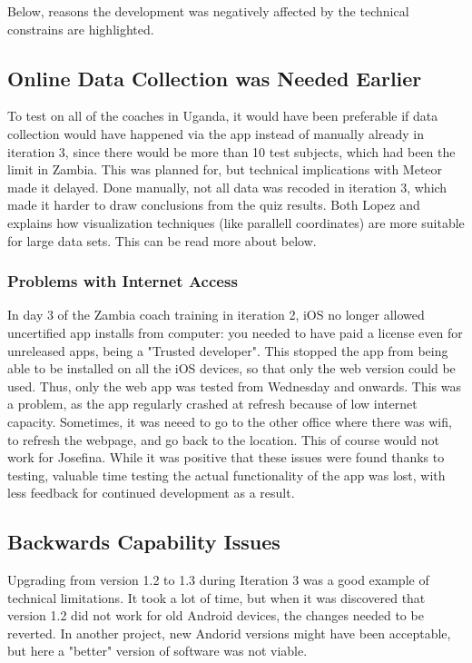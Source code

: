 Below, reasons the development was negatively affected by the technical constrains are highlighted.

\subsection{Online Data Collection was Needed Earlier}
To test on all of the coaches in Uganda, it would have been preferable if data collection would have happened via the app instead of manually already in iteration 3, since there would be more than 10 test subjects, which had been the limit in Zambia. This was planned for, but technical implications with Meteor made it delayed. Done manually, not all data was recoded in iteration 3, which made it harder to draw conclusions from the quiz results. Both Lopez \cite{une-terre} and \cite{ropinski} explains how visualization techniques (like parallell coordinates) are more suitable for large data sets. This can be read more about below.

\subsubsection{Problems with Internet Access}
In day 3 of the Zambia coach training in iteration 2, iOS no longer allowed uncertified app installs from computer: you needed to have paid a license even for unreleased apps, being a "Trusted developer". This stopped the app from being able to be installed on all the iOS devices, so that only the web version could be used. Thus, only the web app was tested from Wednesday and onwards. This was a problem, as the app regularly crashed at refresh because of low internet capacity. Sometimes, it was neeed to go to the other office where there was wifi, to refresh the webpage, and go back to the location. This of course would not work for Josefina. While it was positive that these issues were found thanks to testing, valuable time testing the actual functionality of the app was lost, with less feedback for continued development as a result.

\subsection{Backwards Capability Issues} \label{backwards-capability}
Upgrading from version 1.2 to 1.3 during Iteration 3 was a good example of technical limitations. It took a lot of time, but when it was discovered that version 1.2 did not work for old Android devices, the changes needed to be reverted. In another project, new Andorid versions might have been acceptable, but here a "better" version of software was not viable.

